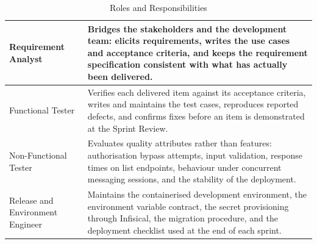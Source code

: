 \begin{table}[H]
\begin{tabular}{|p{3.8cm}|p{9.6cm}|}
Requirement Analyst &
Bridges the stakeholders and the development team: elicits requirements, writes the use cases and acceptance criteria, and keeps the requirement specification consistent with what has actually been delivered.
\\ \hline

Functional Tester &
Verifies each delivered item against its acceptance criteria, writes and maintains the test cases, reproduces reported defects, and confirms fixes before an item is demonstrated at the Sprint Review.
\\ \hline

Non-Functional Tester &
Evaluates quality attributes rather than features: authorisation bypass attempts, input validation, response times on list endpoints, behaviour under concurrent messaging sessions, and the stability of the deployment.
\\ \hline

Release and Environment Engineer &
Maintains the containerised development environment, the environment variable contract, the secret provisioning through Infisical, the migration procedure, and the deployment checklist used at the end of each sprint.
\\ \hline

\end{tabular}
\caption{Roles and Responsibilities}
\label{tab:roles_responsibilities}
\end{table}
